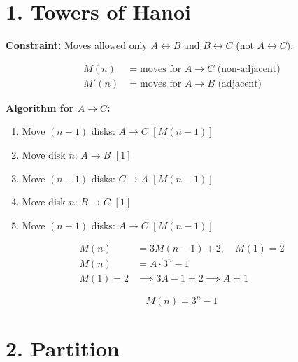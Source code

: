 \documentclass[11pt]{article}
\begin{document}
\section*{1. Towers of Hanoi}

\textbf{Constraint:} Moves allowed only $A \leftrightarrow B$ and $B \leftrightarrow C$ (not $A \leftrightarrow C$).

\begin{align*}
M(n) &= \text{moves for } A \to C \text{ (non-adjacent)} \\
M'(n) &= \text{moves for } A \to B \text{ (adjacent)}
\end{align*}

\textbf{Algorithm for $A \to C$:}
\begin{enumerate}[nosep]
\item Move $(n-1)$ disks: $A \to C$ \hfill $[M(n-1)]$
\item Move disk $n$: $A \to B$ \hfill $[1]$
\item Move $(n-1)$ disks: $C \to A$ \hfill $[M(n-1)]$
\item Move disk $n$: $B \to C$ \hfill $[1]$
\item Move $(n-1)$ disks: $A \to C$ \hfill $[M(n-1)]$
\end{enumerate}

\begin{align*}
M(n) &= 3M(n-1) + 2, \quad M(1) = 2 \\
M(n) &= A \cdot 3^n - 1 \\
M(1) = 2 &\implies 3A - 1 = 2 \implies A = 1
\end{align*}

\[
\boxed{M(n) = 3^n - 1}
\]


\section*{2. Partition}
\end{document}
